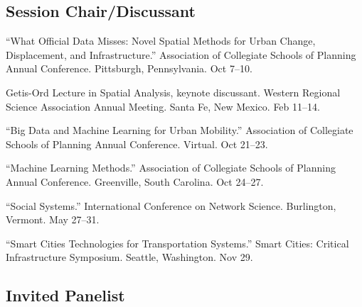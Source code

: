 \documentclass[11pt,letterpaper]{report} %
\begin{document}
\subsection*{Session Chair/Discussant}

\begin{tablist}

\item[2026] \tab{}\enquote{What Official Data Misses: Novel Spatial Methods for Urban Change, Displacement, and Infrastructure.} Association of Collegiate Schools of Planning Annual Conference. Pittsburgh, Pennsylvania. Oct 7--10.

\item[2026] \tab{}Getis-Ord Lecture in Spatial Analysis, keynote discussant. Western Regional Science Association Annual Meeting. Santa Fe, New Mexico. Feb 11--14.

\item[2021] \tab{}\enquote{Big Data and Machine Learning for Urban Mobility.} Association of Collegiate Schools of Planning Annual Conference. Virtual. Oct 21--23.

\item[2019] \tab{}\enquote{Machine Learning Methods.} Association of Collegiate Schools of Planning Annual Conference. Greenville, South Carolina. Oct 24--27.

\item[2019] \tab{}\enquote{Social Systems.} International Conference on Network Science. Burlington, Vermont. May 27--31.

\item[2018] \tab{}\enquote{Smart Cities Technologies for Transportation Systems.} Smart Cities: Critical Infrastructure Symposium. Seattle, Washington. Nov 29.

\end{tablist}

\subsection*{Invited Panelist}
\end{document}
